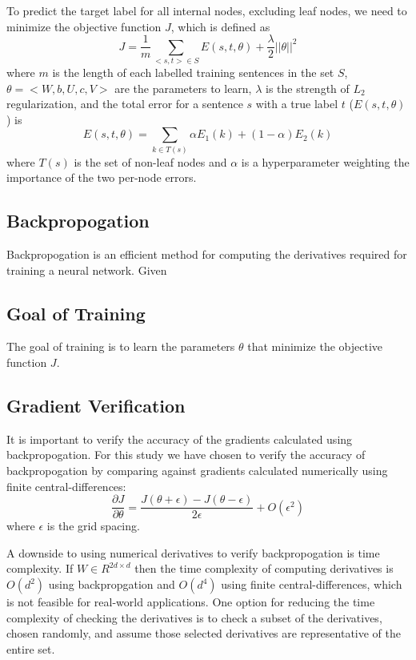 \documentclass{article}
\begin{document}
To predict the target label for all internal nodes, excluding leaf nodes, we need to minimize the objective function $J$, which is defined as
\begin{equation}
    J = \frac{1}{m} \sum_{<s,t> \in S} E(s, t, \theta) + \frac{\lambda}{2} ||\theta||^2
\end{equation}
where $m$ is the length of each labelled training sentences in the set $S$, $\theta = < W, b, U, c, V >$ are the parameters to learn, $\lambda$ is the strength of $L_2$ regularization, and the total error for a sentence $s$ with a true label $t$ ($E(s, t, \theta)$) is
\begin{equation}
    E(s,t, \theta) = \sum_{k \in T(s)} \alpha E_1(k) + (1-\alpha) E_2(k)
\end{equation}
where $T(s)$ is the set of non-leaf nodes and $\alpha$ is a hyperparameter weighting the importance of the two per-node errors.


%
%
\subsection{Backpropogation}
Backpropogation is an efficient method for computing the derivatives required for training a neural network. Given



\subsection{Goal of Training}
The goal of training is to learn the parameters $\theta$ that minimize the objective function $J$.



\subsection{Gradient Verification}
It is important to verify the accuracy of the gradients calculated using backpropogation. For this study we have chosen to verify the accuracy of backpropogation by comparing against gradients calculated numerically using finite central-differences:
\begin{equation}
    \frac{\partial J}{\partial \theta} = \frac{J(\theta + \epsilon) - J(\theta - \epsilon)}{2\epsilon} + O(\epsilon ^2)
\end{equation}
where $\epsilon$ is the grid spacing.

A downside to using numerical derivatives to verify backpropogation is time complexity. If $W \in R^{2d \times d}$ then the time complexity of computing derivatives is $O(d^2)$ using backpropgation and $O(d^4)$ using finite central-differences, which is not feasible for real-world applications. One option for reducing the time complexity of checking the derivatives is to check a subset of the derivatives, chosen randomly, and assume those selected derivatives are representative of the entire set.
\end{document}
